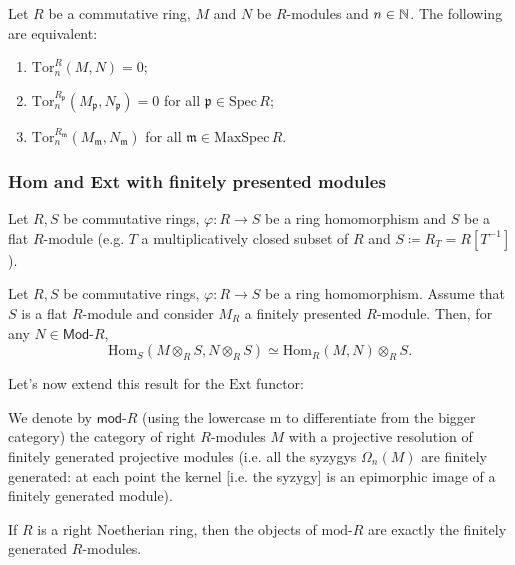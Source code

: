 \begin{cor}
	Let $R$ be a commutative ring, $M$ and $N$ be $R$-modules and $n \in \mathbb{N}$.
	The following are equivalent:
	\begin{enumerate}
		\item $\mathrm{Tor}^R_n (M,N) = 0$;
		\item $\mathrm{Tor}_n^{R_{\mathfrak{p}}}(M_{\mathfrak{p}}, N_{\mathfrak{p}}) = 0$
			for all $\mathfrak{p} \in \mathrm{Spec}\, R$;
		\item $\mathrm{Tor}_n^{R_{\mathfrak{m}}} (M_{\mathfrak{m}}, N_{\mathfrak{m}})$
			for all $\mathfrak{m} \in \mathrm{MaxSpec}\, R$.
	\end{enumerate}
\end{cor} 

\subsubsection{Hom and Ext with finitely presented modules}
Let $R, S$ be commutative rings, $\varphi\colon R \to S$ be a ring homomorphism
and $S$ be a flat $R$-module 
(e.g. $T$ a multiplicatively closed subset of $R$
and $S \coloneqq R_T = R[T^{-1}]$).

\begin{prop}
	Let $R,S$ be commutative rings, $\varphi\colon R \to S$ be a ring homomorphism.
	Assume that $S$ is a flat $R$-module
	and consider $M_R$ a finitely presented $R$-module.
	Then, for any $N \in \mathsf{Mod}\text{-}R$,
	\begin{equation}
	\mathrm{Hom}_{ S}\left( M \otimes_R S, N \otimes_R S \right) \simeq
	\mathrm{Hom}_{ R}\left( M, N \right) \otimes_R S
	.\end{equation} 	
\end{prop} 

Let's now extend this result for the $\mathrm{Ext}$ functor:
\begin{defn}
	We denote by $\mathsf{mod}\text{-}R$ (using the lowercase m to differentiate from the
	bigger category) the category of right $R$-modules $M$ with a projective
	resolution of finitely generated projective modules
	(i.e. all the syzygys $\Omega_n(M)$ are finitely generated:
	at each point the kernel [i.e. the syzygy] is an epimorphic image of a finitely generated module).
\end{defn}

\begin{rem}[]
	If $R$ is a right Noetherian ring, then
	the objects of $\mathrm{mod}\text{-}R$ are exactly the finitely generated $R$-modules.
\end{rem}

